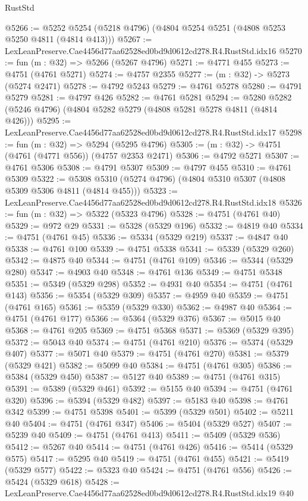 \begin{lexlean}{RustStd}
\begin{coremodule}
@5266 := @5252 @5254 (@5218 @4796) (@4804 @5254 @5251 (@4808 @5253 @5250 @4811 (@4814 @413)))
@5267 := LexLeanPreserve.Cae4456d77aa62528ed0bd9d0612cd278.R4.RustStd.idx16
@5270 := fun (m : @32) => @5266 (@5267 @4796)
@5271 := @4771 @455
@5273 := @4751 (@4761 @5271)
@5274 := @4757 @2355
@5277 := (m : @32) -> @5273 (@5274 @2471)
@5278 := @4792 @5243
@5279 := @4761 @5278
@5280 := @4791 @5279
@5281 := @4797 @426
@5282 := @4761 @5281
@5294 := @5280 @5282 (@5246 @4796) (@4804 @5282 @5279 (@4808 @5281 @5278 @4811 (@4814 @426)))
@5295 := LexLeanPreserve.Cae4456d77aa62528ed0bd9d0612cd278.R4.RustStd.idx17
@5298 := fun (m : @32) => @5294 (@5295 @4796)
@5305 := (m : @32) -> @4751 (@4761 (@4771 @556)) (@4757 @2353 @2471)
@5306 := @4792 @5271
@5307 := @4761 @5306
@5308 := @4791 @5307
@5309 := @4797 @455
@5310 := @4761 @5309
@5322 := @5308 @5310 (@5274 @4796) (@4804 @5310 @5307 (@4808 @5309 @5306 @4811 (@4814 @455)))
@5323 := LexLeanPreserve.Cae4456d77aa62528ed0bd9d0612cd278.R4.RustStd.idx18
@5326 := fun (m : @32) => @5322 (@5323 @4796)
@5328 := @4751 (@4761 @40)
@5329 := @972 @29
@5331 := @5328 (@5329 @196)
@5332 := @4819 @40
@5334 := @4751 (@4761 @45)
@5336 := @5334 (@5329 @219)
@5337 := @4847 @40
@5338 := @4761 @100
@5339 := @4751 @5338
@5341 := @5339 (@5329 @260)
@5342 := @4875 @40
@5344 := @4751 (@4761 @109)
@5346 := @5344 (@5329 @280)
@5347 := @4903 @40
@5348 := @4761 @136
@5349 := @4751 @5348
@5351 := @5349 (@5329 @298)
@5352 := @4931 @40
@5354 := @4751 (@4761 @143)
@5356 := @5354 (@5329 @309)
@5357 := @4959 @40
@5359 := @4751 (@4761 @165)
@5361 := @5359 (@5329 @330)
@5362 := @4987 @40
@5364 := @4751 (@4761 @177)
@5366 := @5364 (@5329 @376)
@5367 := @5015 @40
@5368 := @4761 @205
@5369 := @4751 @5368
@5371 := @5369 (@5329 @395)
@5372 := @5043 @40
@5374 := @4751 (@4761 @210)
@5376 := @5374 (@5329 @407)
@5377 := @5071 @40
@5379 := @4751 (@4761 @270)
@5381 := @5379 (@5329 @421)
@5382 := @5099 @40
@5384 := @4751 (@4761 @305)
@5386 := @5384 (@5329 @450)
@5387 := @5127 @40
@5389 := @4751 (@4761 @315)
@5391 := @5389 (@5329 @461)
@5392 := @5155 @40
@5394 := @4751 (@4761 @320)
@5396 := @5394 (@5329 @482)
@5397 := @5183 @40
@5398 := @4761 @342
@5399 := @4751 @5398
@5401 := @5399 (@5329 @501)
@5402 := @5211 @40
@5404 := @4751 (@4761 @347)
@5406 := @5404 (@5329 @527)
@5407 := @5239 @40
@5409 := @4751 (@4761 @413)
@5411 := @5409 (@5329 @536)
@5412 := @5267 @40
@5414 := @4751 (@4761 @426)
@5416 := @5414 (@5329 @575)
@5417 := @5295 @40
@5419 := @4751 (@4761 @455)
@5421 := @5419 (@5329 @577)
@5422 := @5323 @40
@5424 := @4751 (@4761 @556)
@5426 := @5424 (@5329 @618)
@5428 := LexLeanPreserve.Cae4456d77aa62528ed0bd9d0612cd278.R4.RustStd.idx19 @40

\end{coremodule}
\end{lexlean}

